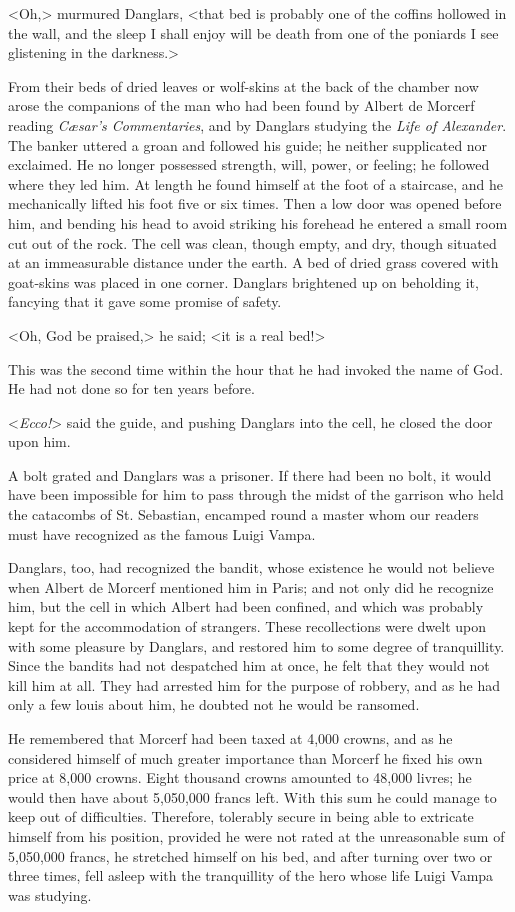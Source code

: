  <Oh,> murmured Danglars, <that bed is probably one of the coffins hollowed in the wall, and the sleep I shall enjoy will be death from one of the poniards I see glistening in the darkness.> 

 From their beds of dried leaves or wolf-skins at the back of the chamber now arose the companions of the man who had been found by Albert de Morcerf reading \textit{Cæsar's Commentaries}, and by Danglars studying the \textit{Life of Alexander}. The banker uttered a groan and followed his guide; he neither supplicated nor exclaimed. He no longer possessed strength, will, power, or feeling; he followed where they led him. At length he found himself at the foot of a staircase, and he mechanically lifted his foot five or six times. Then a low door was opened before him, and bending his head to avoid striking his forehead he entered a small room cut out of the rock. The cell was clean, though empty, and dry, though situated at an immeasurable distance under the earth. A bed of dried grass covered with goat-skins was placed in one corner. Danglars brightened up on beholding it, fancying that it gave some promise of safety. 

 <Oh, God be praised,> he said; <it is a real bed!> 

 This was the second time within the hour that he had invoked the name of God. He had not done so for ten years before. 

 <\textit{Ecco!}> said the guide, and pushing Danglars into the cell, he closed the door upon him. 

 A bolt grated and Danglars was a prisoner. If there had been no bolt, it would have been impossible for him to pass through the midst of the garrison who held the catacombs of St. Sebastian, encamped round a master whom our readers must have recognized as the famous Luigi Vampa. 

 Danglars, too, had recognized the bandit, whose existence he would not believe when Albert de Morcerf mentioned him in Paris; and not only did he recognize him, but the cell in which Albert had been confined, and which was probably kept for the accommodation of strangers. These recollections were dwelt upon with some pleasure by Danglars, and restored him to some degree of tranquillity. Since the bandits had not despatched him at once, he felt that they would not kill him at all. They had arrested him for the purpose of robbery, and as he had only a few louis about him, he doubted not he would be ransomed. 

 He remembered that Morcerf had been taxed at 4,000 crowns, and as he considered himself of much greater importance than Morcerf he fixed his own price at 8,000 crowns. Eight thousand crowns amounted to 48,000 livres; he would then have about 5,050,000 francs left. With this sum he could manage to keep out of difficulties. Therefore, tolerably secure in being able to extricate himself from his position, provided he were not rated at the unreasonable sum of 5,050,000 francs, he stretched himself on his bed, and after turning over two or three times, fell asleep with the tranquillity of the hero whose life Luigi Vampa was studying. 